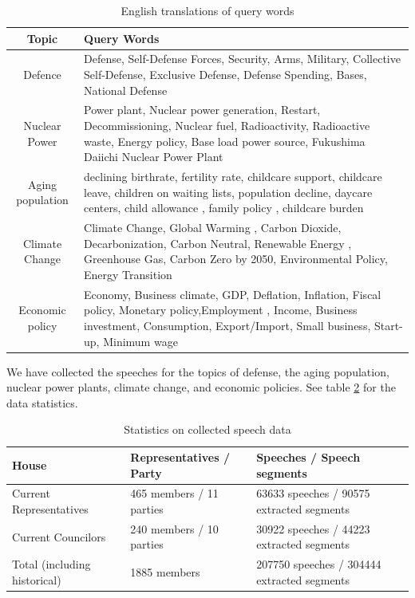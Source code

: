\documentclass[final,5p,times,twocolumn,authoryear]{elsarticle}
\begin{document}
\begin{table}[htbp] %
\centering
\begin{tabularx}{.45\textwidth}{ c|X } 
\hline
Topic & Query Words \\  
\hline
Defence & Defense, Self-Defense Forces, Security, Arms, Military, Collective Self-Defense, Exclusive Defense, Defense Spending, Bases, National Defense \\ 
\hline
Nuclear Power &  Power plant, Nuclear power generation, Restart, Decommissioning, Nuclear fuel, Radioactivity, Radioactive waste, Energy policy, Base load power source, Fukushima Daiichi Nuclear Power Plant \\
\hline
Aging population & declining birthrate, fertility rate, childcare support, childcare leave, children on waiting lists, population decline, daycare centers, child allowance , family policy , childcare burden \\
\hline
Climate Change & Climate Change, Global Warming , Carbon Dioxide, Decarbonization, Carbon Neutral, Renewable Energy , Greenhouse Gas, Carbon Zero by 2050, Environmental Policy, Energy Transition\\
\hline
Economic policy & Economy, Business climate, GDP, Deflation, Inflation, Fiscal policy, Monetary policy,Employment , Income, Business investment, Consumption, Export/Import, Small business, Start-up, Minimum wage\\
\hline
\end{tabularx}
\caption{English translations of query words}\label{tab:English-query}
\end{table}

We have collected the speeches for the topics of defense, the aging population, nuclear power plants, climate change, and economic policies. See table \ref{tab:stats} for the data statistics. 

\begin{table}[htbp] %
\centering
\begin{tabularx}{.45\textwidth}{ X|X|X } 
\hline
House & Representatives / Party & Speeches / Speech segments\\  
\hline
Current Representatives & 465 members / 11 parties & 63633 speeches / 90575 extracted segments \\ 
\hline
Current Councilors & 240 members / 10 parties  & 30922 speeches / 44223 extracted segments \\
\hline
Total (including historical) & 1885 members & 207750 speeches / 304444 extracted segments\\
\hline
\end{tabularx}
\caption{Statistics on collected speech data}
\label{tab:stats}
\end{table}
\end{document}
